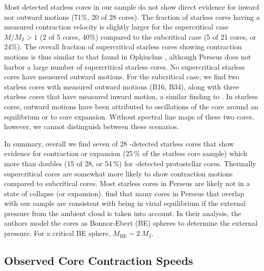 \documentclass[iop,twocolappendix]{emulateapj}
\begin{document}
Most detected starless cores in our sample do not show direct evidence for inward nor outward motions (71\%, 20 of 28 cores). The fraction of starless cores having a measured contraction velocity is slightly larger for the supercritical case $M/M_\mathrm{J} > 1$ (2 of 5 cores, 40\%) compared to the subcritical case (5 of 21 cores, or 24\%). The overall fraction of supercritical starless cores showing contraction motions is thus similar to that found in Ophiuchus \citep[40\,\% vs.\ 40-60\,\%;][]{simpson11}, although Perseus does not harbor a large number of supercritical starless cores. No supercritical starless cores have measured outward motions. For the subcritical case, we find two starless cores with measured outward motions (B16, B34), along with three starless cores that have measured inward motion, a similar finding to \citet{Schnee2013}. In starless cores, outward motions have been attributed to oscillations of the core around an equilibrium \citep{lada03,lee11,broderick10} or to core expansion. Without spectral line maps of these two cores, however, we cannot distinguish between these scenarios. 

In summary, overall we find seven of 28 \HCO-detected starless cores that show evidence for contraction or expansion (25\,\% of the starless core sample) which more than doubles (15 of 28, or 54\,\%) for \HCO-detected protostellar cores. Thermally supercritical cores are somewhat more likely to show contraction motions compared to subcritical cores. Most starless cores in Perseus are likely not in a state of collapse (or expansion). \citet{Kirk2007} find that many cores in Perseus that overlap with our sample are consistent with being in virial equilibrium if the external pressure from the ambient cloud is taken into account. In their analysis, the authors model the cores as Bonnor-Ebert (BE) spheres to determine the external pressure. For a critical BE sphere, $M_\mathrm{BE} \sim 2 \ M_\mathrm{J}$. 

\subsection{Observed Core Contraction Speeds}
\label{subsec:speeds}
\end{document}
